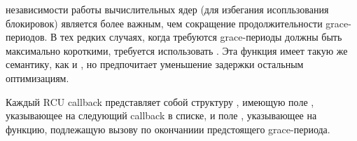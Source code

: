 независимости работы вычислительных ядер
(для избегания исопльзования блокировок) является более важным,
чем сокращение продолжительности grace-периодов.
В тех редких случаях, когда требуются grace-периоды должны быть
максимально короткими, требуется использовать .
Эта функция имеет такую же семантику, как и ,
но предпочитает уменьшение задержки остальным оптимизациям.

Каждый RCU callback представляет собой структуру ,
имеющую поле , указывающее на следующий callback в списке,
и поле , указывающее на функцию, подлежащую вызову
по окончаниии предстоящего grace-периода.
